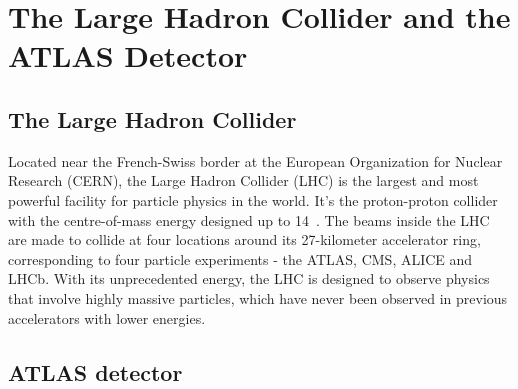 \chapter{The Large Hadron Collider and the ATLAS Detector}

\section{The Large Hadron Collider}
Located near the French-Swiss border at the European Organization for Nuclear Research (CERN),
the Large Hadron Collider (LHC) is the largest and most powerful facility for particle physics in the world.
It's the proton-proton collider with the centre-of-mass energy designed up to 14~\tev.
The beams inside the LHC are made to collide at four locations around its 27-kilometer accelerator ring, 
corresponding to four particle experiments - the ATLAS, CMS, ALICE and LHCb.
With its unprecedented energy, the LHC is designed to observe physics that involve highly massive particles,
which have never been observed in previous accelerators with lower energies.




\section{ATLAS detector}




